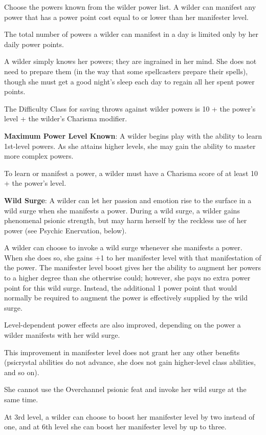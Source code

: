 Choose the powers known from the wilder power list. A wilder can manifest any power that has a power point cost equal to or lower than her manifester level.

The total number of powers a wilder can manifest in a day is limited only by her daily power points.

A wilder simply knows her powers; they are ingrained in her mind. She does not need to prepare them (in the way that some spellcasters prepare their spells), though she must get a good night’s sleep each day to regain all her spent power points.

The Difficulty Class for saving throws against wilder powers is 10 + the power’s level + the wilder’s Charisma modifier.

\textbf{Maximum Power Level Known}: A wilder begins play with the ability to learn 1st-level powers. As she attains higher levels, she may gain the ability to master more complex powers.

To learn or manifest a power, a wilder must have a Charisma score of at least 10 + the power’s level.

\textbf{Wild Surge}: A wilder can let her passion and emotion rise to the surface in a wild surge when she manifests a power. During a wild surge, a wilder gains phenomenal psionic strength, but may harm herself by the reckless use of her power (see Psychic Enervation, below).

A wilder can choose to invoke a wild surge whenever she manifests a power. When she does so, she gains +1 to her manifester level with that manifestation of the power. The manifester level boost gives her the ability to augment her powers to a higher degree than she otherwise could; however, she pays no extra power point for this wild surge. Instead, the additional 1 power point that would normally be required to augment the power is effectively supplied by the wild surge.

Level-dependent power effects are also improved, depending on the power a wilder manifests with her wild surge.

This improvement in manifester level does not grant her any other benefits (psicrystal abilities do not advance, she does not gain higher-level class abilities, and so on).

She cannot use the Overchannel psionic feat and invoke her wild surge at the same time.

At 3rd level, a wilder can choose to boost her manifester level by two instead of one, and at 6th level she can boost her manifester level by up to three.

